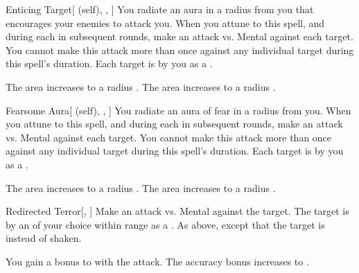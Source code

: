 \lowercase{\hypertarget{spell:Enticing Target}{}}\label{spell:Enticing Target}
\begin{attuneability}[Rank 3]{\hypertarget{spell:Enticing Target}{Enticing Target}}[ (self), , ]
You radiate an aura in a \areasmall radius  from you that encourages your enemies to attack you.
When you attune to this spell, and during each  in subsequent rounds, make an attack vs. Mental against each target.
You cannot make this attack more than once against any individual target during this spell's duration.
\hit Each target is  by you as a .

\rankline
{} The area increases to a \areamed radius .
 The area increases to a \arealarge radius .

\end{attuneability}
\vspace{0.25em}



\lowercase{\hypertarget{spell:Fearsome Aura}{}}\label{spell:Fearsome Aura}
\begin{attuneability}[Rank 3]{\hypertarget{spell:Fearsome Aura}{Fearsome Aura}}[ (self), , ]
You radiate an aura of fear in a \areamed radius  from you.
When you attune to this spell, and during each  in subsequent rounds, make an attack vs. Mental against each target.
You cannot make this attack more than once against any individual target during this spell's duration.
\hit Each target is  by you as a .

\rankline
{} The area increases to a \arealarge radius .
 The area increases to a \areahuge radius .

\end{attuneability}
\vspace{0.25em}



\lowercase{\hypertarget{spell:Redirected Terror}{}}\label{spell:Redirected Terror}
\begin{freeability}[Rank 3]{\hypertarget{spell:Redirected Terror}{Redirected Terror}}[, ]
Make an attack vs. Mental against the target.
\hit The target is \shaken by an  of your choice within range as a .
\crit As above, except that the target is \panicked instead of shaken.

\rankline
{} You gain a  bonus to  with the attack.
 The accuracy bonus increases to .

\end{freeability}
\vspace{0.25em}



